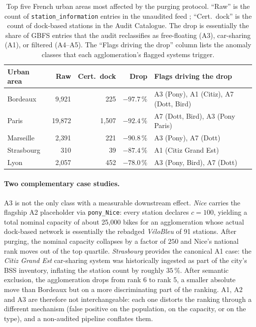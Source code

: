 \documentclass[11pt,a4paper]{article}
\begin{document}
\begin{table}[ht]
\centering
\caption{Top five French urban areas most affected by the purging
protocol. ``Raw'' is the count of \texttt{station\_information}
entries in the unaudited feed ; ``Cert.\ dock'' is the count of
dock-based stations in the Audit Catalogue. The drop is essentially
the share of GBFS entries that the audit reclassifies as
free-floating (A3), car-sharing (A1), or filtered (A4--A5). The
``Flags driving the drop'' column lists the anomaly classes that
each agglomeration's flagged systems trigger.}
\label{tab:top5-reranks}
\small
\begin{tabular}{@{}lrrrl@{}}
\toprule
\textbf{Urban area} & \textbf{Raw} & \textbf{Cert.\ dock}
                    & \textbf{Drop} & \textbf{Flags driving the drop}\\
\midrule
Bordeaux         & 9{,}921 & 225   & $-97.7\,\%$
                 & A3 (Pony), A1 (Citiz), A7 (Dott, Bird) \\
Paris            & 19{,}872 & 1{,}507 & $-92.4\,\%$
                 & A7 (Dott, Bird), A3 (Pony Paris) \\
Marseille        & 2{,}391 & 221   & $-90.8\,\%$
                 & A3 (Pony), A7 (Dott) \\
Strasbourg       & 310     & 39    & $-87.4\,\%$
                 & A1 (Citiz Grand Est) \\
Lyon             & 2{,}057 & 452   & $-78.0\,\%$
                 & A3 (Pony, Bird), A7 (Dott) \\
\bottomrule
\end{tabular}
\end{table}

\paragraph{Two complementary case studies.}
A3 is not the only class with a measurable downstream effect.
\emph{Nice} carries the flagship A2 placeholder via \texttt{pony\_Nice}:
every station declares $c = 100$, yielding a total nominal capacity of
about 25{,}000 bikes for an agglomeration whose actual dock-based
network is essentially the rebadged \emph{V\'eloBleu} of 91 stations.
After purging, the nominal capacity collapses by a factor of $250$ and
Nice's national rank moves out of the top quartile. \emph{Strasbourg}
provides the canonical A1 case: the \emph{Citiz Grand Est} car-sharing
system was historically ingested as part of the city's BSS inventory,
inflating the station count by roughly $35\,\%$. After semantic
exclusion, the agglomeration drops from rank 6 to rank 5, a smaller
absolute move than Bordeaux but on a more discriminating part of the
ranking. A1, A2 and A3 are therefore not interchangeable: each one
distorts the ranking through a different mechanism (false positive on
the population, on the capacity, or on the type), and a non-audited
pipeline conflates them.
\end{document}
